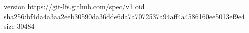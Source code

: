 version https://git-lfs.github.com/spec/v1
oid sha256:bf4da4a3aa2eeb30590da36dde6da7a7072537a94aff4a4586160ee5013ef9e4
size 30484
